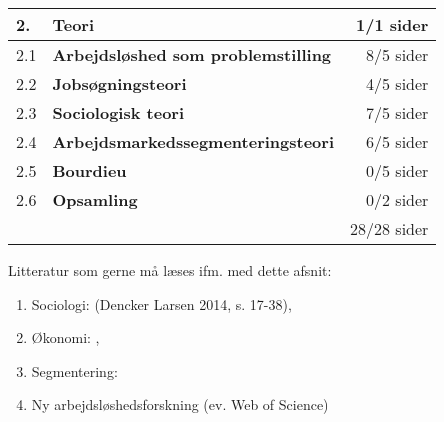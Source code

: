 \begin{table}[h] 
\begin{tabular}{@{}||l||l||r||@{}} \hline \hline 
 2.	 & \textbf{Teori} 								& 1/1 sider \\ \hline \hline 
 2.1 & \textbf{Arbejdsløshed som problemstilling} 	& 8/5 sider \\ \hline \hline 
 2.2 & \textbf{Jobsøgningsteori} 					& 4/5 sider \\ \hline \hline 
 2.3 & \textbf{Sociologisk teori} 					& 7/5 sider \\ \hline \hline 
 2.4 & \textbf{Arbejdsmarkedssegmenteringsteori} 	& 6/5 sider \\ \hline \hline 
 2.5 & \textbf{Bourdieu} 							& 0/5 sider \\ \hline \hline 
 2.6 & \textbf{Opsamling} 							& 0/2 sider \\ \hline \hline 
 	 &												& 28/28 sider \\ \hline \hline 
\end{tabular} \end{table}


Litteratur som gerne må læses ifm. med dette afsnit: 
%
 \begin{enumerate} [topsep=6pt,itemsep=-1ex]
   \item Sociologi: (Dencker Larsen 2014, s. 17-38), \parencite{Baum2006}
   \item Økonomi: \parencite{Clement2006}, \parencite{Cahuc2004}
   \item Segmentering: 
   \item Ny arbejdsløshedsforskning (ev. Web of Science)
 \end{enumerate}

